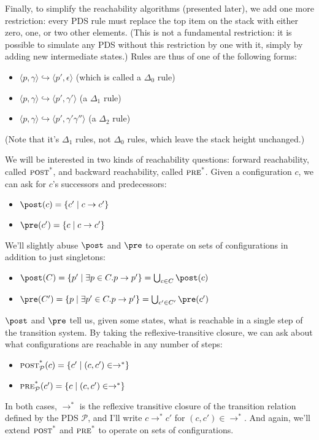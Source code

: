 \documentclass{article}
\newcommand{\Config}[2]{\ensuremath{\langle #1, #2 \rangle}}
\newcommand{\Rule}[2]{\ensuremath{#1 \hookrightarrow #2}}
\newcommand{\poststar}{\ensuremath{\textsc{post}^\textsc{*}}}
\newcommand{\prestar}{\ensuremath{\textsc{pre}^\textsc{*}}}
\begin{document}
Finally, to simplify the reachability algorithms (presented later), we
add one more restriction: every PDS rule must replace the top item on
the stack with either zero, one, or two other elements. (This is not a
fundamental restriction: it is possible to simulate any PDS without
this restriction by one with it, simply by adding new intermediate
states.) Rules are thus of one of the following forms:
\begin{itemize}
\item \Rule{\Config{p}{\gamma}}{\Config{p'}{\epsilon}} (which is called a
$\Delta_0$ rule)
\item \Rule{\Config{p}{\gamma}}{\Config{p'}{\gamma'}} (a $\Delta_1$
  rule)
\item \Rule{\Config{p}{\gamma}}{\Config{p'}{\gamma'\gamma''}} (a
  $\Delta_2$ rule)
\end{itemize}

(Note that it's $\Delta_1$ rules, not $\Delta_0$ rules, which leave
the stack height unchanged.)

We will be interested in two kinds of reachability questions: forward
reachability, called \poststar, and backward reachability, called
\prestar. Given a configuration $c$, we can ask for $c$'s successors
and predecessors:
\begin{itemize}
\item $\post(c) = \{ c' \mid c \rightarrow c' \}$
\item $\pre(c') = \{ c \mid c \rightarrow c' \}$
\end{itemize}
We'll slightly abuse $\post$ and $\pre$ to operate on sets of
configurations in addition to just singletons:
\begin{itemize}
\item $\post(C) = \{p' \mid \exists p\in C. p \rightarrow p' \}
                = \bigcup_{c \in C} \post(c)$
\item $\pre(C') = \{p \mid \exists p'\in C. p \rightarrow p' \}
                = \bigcup_{c' \in C'} \pre(c')$
\end{itemize}

$\post$ and $\pre$ tell us, given some states, what is reachable in a
single step of the transition system. By taking the
reflexive-transitive closure, we can ask about what configurations are
reachable in any number of steps:
\begin{itemize}
\item $\poststar_{\mathcal{P}}(c) = \{c' \mid (c, c') \in \rightarrow^*\}$
\item $\prestar_{\mathcal{P}}(c') = \{c  \mid (c, c') \in \rightarrow^*\}$
\end{itemize}
In both cases, $\rightarrow^*$ is the reflexive transitive closure of
the transition relation defined by the PDS $\mathcal{P}$, and I'll
write $c \rightarrow^* c'$ for $(c, c') \in \rightarrow^*$. And again,
we'll extend $\poststar$ and $\prestar$ to operate on sets of
configurations.
\end{document}
